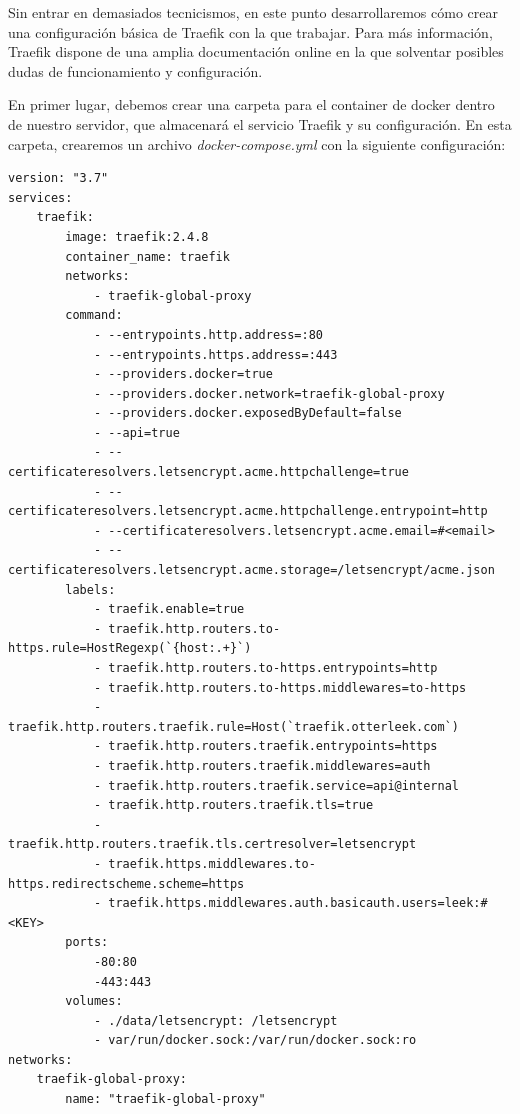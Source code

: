 \documentclass{article}
\begin{document}
Sin entrar en demasiados tecnicismos, en este punto desarrollaremos cómo crear una configuración básica de Traefik con la que trabajar. Para más información, Traefik dispone de una amplia documentación online en la que solventar posibles dudas de funcionamiento y configuración.

En primer lugar, debemos crear una carpeta para el container de docker dentro de nuestro servidor, que almacenará el servicio Traefik y su configuración. En esta carpeta, crearemos un archivo \textit{docker-compose.yml} con la siguiente configuración:

\noindent\begin{minipage}{\textwidth}
\begin{lstlisting}
version: "3.7"
services:
	traefik:
    	image: traefik:2.4.8
    	container_name: traefik
    	networks:
        	- traefik-global-proxy
    	command:
        	- --entrypoints.http.address=:80
        	- --entrypoints.https.address=:443
        	- --providers.docker=true
        	- --providers.docker.network=traefik-global-proxy
        	- --providers.docker.exposedByDefault=false
        	- --api=true
        	- --certificateresolvers.letsencrypt.acme.httpchallenge=true
        	- --certificateresolvers.letsencrypt.acme.httpchallenge.entrypoint=http
        	- --certificateresolvers.letsencrypt.acme.email=#<email>
        	- --certificateresolvers.letsencrypt.acme.storage=/letsencrypt/acme.json
    	labels:
        	- traefik.enable=true
        	- traefik.http.routers.to-https.rule=HostRegexp(`{host:.+}`)
        	- traefik.http.routers.to-https.entrypoints=http
        	- traefik.http.routers.to-https.middlewares=to-https
        	- traefik.http.routers.traefik.rule=Host(`traefik.otterleek.com`)
        	- traefik.http.routers.traefik.entrypoints=https
        	- traefik.http.routers.traefik.middlewares=auth
        	- traefik.http.routers.traefik.service=api@internal
        	- traefik.http.routers.traefik.tls=true
        	- traefik.http.routers.traefik.tls.certresolver=letsencrypt
        	- traefik.https.middlewares.to-https.redirectscheme.scheme=https
        	- traefik.https.middlewares.auth.basicauth.users=leek:#<KEY>
    	ports:
        	-80:80
        	-443:443
    	volumes:
        	- ./data/letsencrypt: /letsencrypt
        	- var/run/docker.sock:/var/run/docker.sock:ro
networks:
	traefik-global-proxy:
    	name: "traefik-global-proxy"
\end{lstlisting}
\end{minipage}\\
\end{document}

